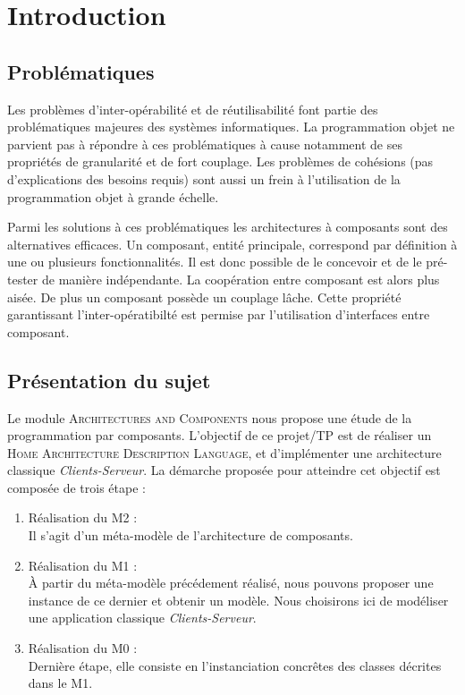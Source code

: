 \chapter{Introduction}\label{chap:Intro}

\section{Problématiques}
Les problèmes d'inter-opérabilité et de réutilisabilité font partie des problématiques majeures des systèmes informatiques. La programmation objet ne parvient pas à répondre à ces problématiques à cause notamment de ses propriétés de granularité et de fort couplage. Les problèmes de cohésions (pas d'explications des besoins requis) sont aussi un frein à l'utilisation de la programmation objet à grande échelle. 

Parmi les solutions à ces problématiques les architectures à composants sont des alternatives efficaces. Un composant, entité principale, correspond par définition à une ou plusieurs fonctionnalités. Il est donc possible de le concevoir et de le pré-tester de manière indépendante. La coopération entre composant est alors plus aisée. De plus un composant possède un couplage lâche. Cette propriété garantissant l'inter-opératibilté est permise par l'utilisation d'interfaces entre composant. 

\section{Présentation du sujet}
Le module \textsc{Architectures and Components} nous propose une étude de la programmation par composants. L'objectif de ce projet/TP  est de réaliser un \textsc{Home Architecture Description Language}, et d'implémenter une architecture classique \emph{Clients-Serveur}. La démarche proposée pour atteindre cet objectif est composée de trois étape : 


\begin{enumerate}
\item 
  Réalisation du M2 :\hfill \\
  Il s'agit d'un méta-modèle de l'architecture de composants.  
\item
  Réalisation du M1 :\hfill \\
  À partir du méta-modèle précédement réalisé, nous pouvons proposer une instance de ce dernier et obtenir un modèle. Nous choisirons ici de modéliser une application classique \emph{Clients-Serveur}.  
\item
  Réalisation du M0 :\hfill \\
  Dernière étape, elle consiste en l'instanciation concrêtes des classes décrites dans le M1.
\end{enumerate}

